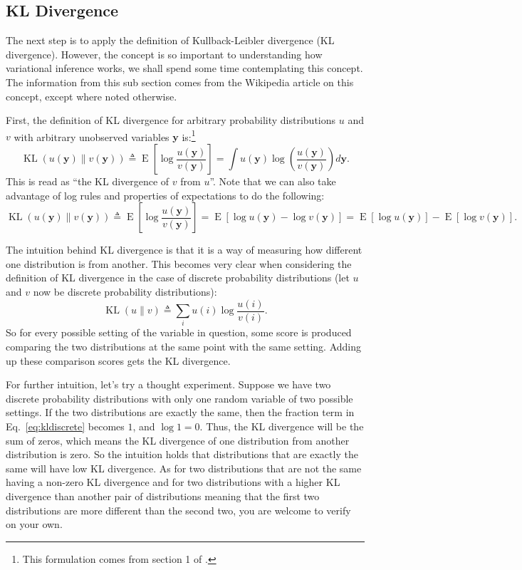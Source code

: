 \documentclass[12pt]{article}
\newcommand{\KL}{\operatorname{KL}}
\newcommand{\E}{\operatorname{E}}
\begin{document}
\subsection{KL Divergence}

The next step is to apply the definition of Kullback-Leibler divergence (KL
divergence).  However, the concept is so important to understanding how
variational inference works, we shall spend some time contemplating this
concept.  The information from this sub section comes from the Wikipedia article
on this concept, except where noted otherwise.

First, the definition of KL divergence for arbitrary probability distributions
$u$ and $v$ with arbitrary unobserved variables $\bm{y}$ is:\footnote{This
formulation comes from section 1 of \autocite{kb}.}
\begin{equation}\label{eq:kldef}
    \KL(u(\bm{y}) \parallel v(\bm{y})) \triangleq
    \E\left[\log{\frac{u(\bm{y})}{v(\bm{y})}}\right] =
    \int u(\bm{y}) \log\left(\frac{u(\bm{y})}{v(\bm{y})}\right) d\bm{y}.
\end{equation}
This is read as \enquote{the KL divergence of $v$ from $u$}.  Note that we can
also take advantage of log rules and properties of expectations to do the
following:
\begin{equation}\label{eq:klexpected}
    \KL(u(\bm{y}) \parallel v(\bm{y})) \triangleq
    \E\left[\log{\frac{u(\bm{y})}{v(\bm{y})}}\right] =
    \E\left[\log{u(\bm{y})} - \log{v(\bm{y})}\right] =
    \E\left[\log{u(\bm{y})}\right] - \E\left[\log{v(\bm{y})}\right].
\end{equation}

The intuition behind KL divergence is that it is a way of measuring how
different one distribution is from another.  This becomes very clear when
considering the definition of KL divergence in the case of discrete probability
distributions (let $u$ and $v$ now be discrete probability distributions):
\begin{equation}\label{eq:kldiscrete}
    \KL(u \parallel v) \triangleq
    \sum_{i} u(i) \log{\frac{u(i)}{v(i)}}.
\end{equation}
So for every possible setting of the variable in question, some score is
produced comparing the two distributions at the same point with the same
setting.  Adding up these comparison scores gets the KL divergence.

For further intuition, let's try a thought experiment.  Suppose we have two
discrete probability distributions with only one random variable of two possible
settings.  If the two distributions are exactly the same, then the fraction term
in Eq.~\ref{eq:kldiscrete} becomes $1$, and $\log{1} = 0$.  Thus, the KL
divergence will be the sum of zeros, which means the KL divergence of one
distribution from another distribution is zero.  So the intuition holds that
distributions that are exactly the same will have low KL divergence.  As for two
distributions that are not the same having a non-zero KL divergence and for two
distributions with a higher KL divergence than another pair of distributions
meaning that the first two distributions are more different than the second two,
you are welcome to verify on your own.
\end{document}
